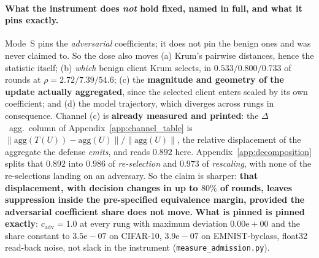 \documentclass{article}
\begin{document}
\paragraph{What the instrument does \emph{not} hold fixed, named in full, and what it pins exactly.} Mode~S pins the \emph{adversarial} coefficients; it does not pin the benign ones and was never claimed to. So the dose also moves (a) Krum's pairwise distances, hence the statistic itself; (b) \emph{which} benign client Krum selects, in $0.533/0.800/0.733$ of rounds at $\rho{=}2.72/7.39/54.6$; (c) the \textbf{magnitude and geometry of the update actually aggregated}, since the selected client enters scaled by its own coefficient; and (d) the model trajectory, which diverges across rungs in consequence. Channel (c) is \textbf{already measured and printed}: the $\Delta$~agg.\ column of Appendix~\ref{app:channel_table} is $\|\mathrm{agg}(T(U)) - \mathrm{agg}(U)\|/\|\mathrm{agg}(U)\|$, the relative displacement of the aggregate the defense \emph{emits}, and reads $\mathbf{0.892}$ here. Appendix~\ref{app:decomposition} splits that $0.892$ into $0.986$ of \emph{re-selection} and $0.973$ of \emph{rescaling}, with none of the re-selections landing on an adversary. So the claim is sharper: \textbf{that displacement, with decision changes in up to $80\%$ of rounds, leaves suppression inside the pre-specified equivalence margin, provided the adversarial coefficient share does not move.} \textbf{What is pinned is pinned exactly}: $c_{\mathrm{adv}}{=}1.0$ at every rung with maximum deviation $0.00\mathrm{e}{+}00$ and the share constant to $3.5\mathrm{e}{-}07$ on CIFAR-10, $3.9\mathrm{e}{-}07$ on EMNIST-byclass, float32 read-back noise, not slack in the instrument (\texttt{measure\_admission.py}).
\end{document}
